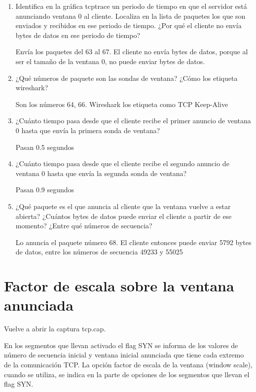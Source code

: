 \documentclass[12pt, a4paper]{report}
\begin{document}
\begin{enumerate}
	\item Identifica en la gráfica tcptrace un periodo de tiempo en que el servidor está anunciando ventana 0 al cliente. Localiza en la lista de paquetes los que son enviados y recibidos en ese periodo de tiempo. ¿Por qué el cliente no envía bytes de datos en ese periodo de tiempo?
	
	Envía los paquetes del 63 al 67. El cliente no envía bytes de datos, porque al ser el tamaño de la ventana 0, no puede enviar bytes de datos.
	
	\item ¿Qué números de paquete son las sondas de ventana? ¿Cómo los etiqueta wireshark?
	
	Son los números 64, 66. Wireshark los etiqueta como TCP Keep-Alive
	
	\item ¿Cuánto tiempo pasa desde que el cliente recibe el primer anuncio de ventana 0 hasta que envía la primera sonda de ventana?
	
	Pasan 0.5 segundos
	
	\item ¿Cuánto tiempo pasa desde que el cliente recibe el segundo anuncio de ventana 0 hasta que envía la segunda sonda de ventana?
	
	Pasan 0.9 segundos
	
	\item ¿Qué paquete es el que anuncia al cliente que la ventana vuelve a estar abierta? ¿Cuántos bytes de datos puede enviar el cliente a partir de ese momento? ¿Entre qué números de secuencia?
	
	Lo anuncia el paquete número 68. El cliente entonces puede enviar 5792 bytes de datos, entre los números de secuencia 49233 y 55025
	
\end{enumerate}

\section{Factor de escala sobre la ventana anunciada}
Vuelve a abrir la captura tcp.cap.

En los segmentos que llevan activado el flag SYN se informa de los valores de número de secuencia inicial y ventana inicial anunciada que tiene cada extremo de la comunicación TCP. La opción factor de escala de la ventana (window scale), cuando se utiliza, se indica en la parte de opciones de los segmentos que llevan el flag SYN.
\end{document}
